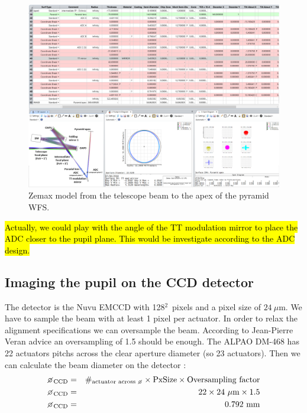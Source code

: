 \documentclass[12pt,a4paper]{article}
\begin{document}
\begin{figure}[H]
	\begin{center}
		\includegraphics[width=\textwidth]{images/Zemax_model_FP_ApexPyr.PNG}
		\caption{Zemax model from the telescope beam to the apex of the pyramid WFS.}\label{fig:Zemax_model_FP_ApexPyr}
	\end{center}
\end{figure}

\hl{Actually, we could play with the angle of the TT modulation mirror to place the ADC closer to the pupil plane. This would be investigate according to the ADC design.}



\subsection{Imaging the pupil on the CCD detector}\label{subsec:4eme_partie}
The detector is the Nuvu EMCCD with 128$^2$~pixels and a pixel size of $24~\mu$m. We have to sample the beam with at least 1 pixel per actuator. In order to relax the alignment specifications we can oversample the beam. According to Jean-Pierre Veran advice an oversampling of 1.5 should be enough. The ALPAO DM-468 has 22 actuators pitchs across the clear aperture diameter (so 23 actuators). Then we can calculate the beam diameter on the detector :
\begin{eqnarray}
	\diameter_{\text{CCD}} &= &\#_{\text{actuator across \diameter}}\times \text{PxSize}\times\text{Oversampling factor}\\
	\diameter_{\text{CCD}} &= &22\times 24~\mu\text{m}\times 1.5\\
	\diameter_{\text{CCD}} &= &0.792\,\,\text{mm}
\end{eqnarray}
\end{document}
